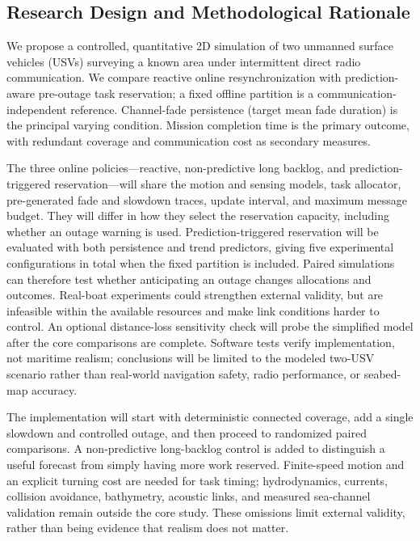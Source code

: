 \subsection{Research Design and Methodological Rationale}

We propose a controlled, quantitative 2D simulation of two unmanned surface vehicles (USVs) surveying a known area under intermittent direct radio communication. We compare reactive online resynchronization with prediction-aware pre-outage task reservation; a fixed offline partition is a communication-independent reference. Channel-fade persistence (target mean fade duration) is the principal varying condition. Mission completion time is the primary outcome, with redundant coverage and communication cost as secondary measures.

The three online policies---reactive, non-predictive long backlog, and prediction-triggered reservation---will share the motion and sensing models, task allocator, pre-generated fade and slowdown traces, update interval, and maximum message budget. They will differ in how they select the reservation capacity, including whether an outage warning is used. Prediction-triggered reservation will be evaluated with both persistence and trend predictors, giving five experimental configurations in total when the fixed partition is included. Paired simulations can therefore test whether anticipating an outage changes allocations and outcomes. Real-boat experiments could strengthen external validity, but are infeasible within the available resources and make link conditions harder to control. An optional distance-loss sensitivity check will probe the simplified model after the core comparisons are complete. Software tests verify implementation, not maritime realism; conclusions will be limited to the modeled two-USV scenario rather than real-world navigation safety, radio performance, or seabed-map accuracy.

The implementation will start with deterministic connected coverage, add a single slowdown and controlled outage, and then proceed to randomized paired comparisons. A non-predictive long-backlog control is added to distinguish a useful forecast from simply having more work reserved. Finite-speed motion and an explicit turning cost are needed for task timing; hydrodynamics, currents, collision avoidance, bathymetry, acoustic links, and measured sea-channel validation remain outside the core study. These omissions limit external validity, rather than being evidence that realism does not matter.


